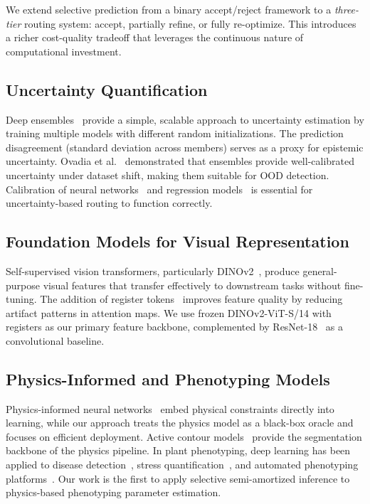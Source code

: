 \documentclass[11pt,a4paper]{article}
\begin{document}
We extend selective prediction from a binary accept/reject framework to a
\emph{three-tier} routing system: accept, partially refine, or fully re-optimize.
This introduces a richer cost-quality tradeoff that leverages the
continuous nature of computational investment.

\subsection{Uncertainty Quantification}

Deep ensembles~\cite{lakshminarayanan2017simple} provide a simple, scalable
approach to uncertainty estimation by training multiple models with different
random initializations. The prediction disagreement (standard deviation across
members) serves as a proxy for epistemic uncertainty.
Ovadia et al.~\cite{ovadia2019can} demonstrated that ensembles provide
well-calibrated uncertainty under dataset shift, making them suitable for
OOD detection. Calibration of neural networks~\cite{guo2017calibration}
and regression models~\cite{kuleshov2018accurate} is essential for
uncertainty-based routing to function correctly.

\subsection{Foundation Models for Visual Representation}

Self-supervised vision transformers, particularly DINOv2~\cite{oquab2024dinov2},
produce general-purpose visual features that transfer effectively to
downstream tasks without fine-tuning. The addition of register
tokens~\cite{darcet2024vision} improves feature quality by reducing
artifact patterns in attention maps. We use frozen DINOv2-ViT-S/14
with registers as our primary feature backbone, complemented by
ResNet-18~\cite{he2016deep} as a convolutional baseline.

\subsection{Physics-Informed and Phenotyping Models}

Physics-informed neural networks~\cite{raissi2019physics,karniadakis2021physics}
embed physical constraints directly into learning, while our approach treats
the physics model as a black-box oracle and focuses on efficient deployment.
Active contour models~\cite{kass1988snakes,chan2001active} provide the
segmentation backbone of the physics pipeline.
In plant phenotyping, deep learning has been applied to disease
detection~\cite{mutka2015image,mahlein2016plant},
stress quantification~\cite{singh2021plantdoc}, and automated
phenotyping platforms~\cite{ubbens2017deep,li2014review}.
Our work is the first to apply selective semi-amortized inference
to physics-based phenotyping parameter estimation.
\end{document}
